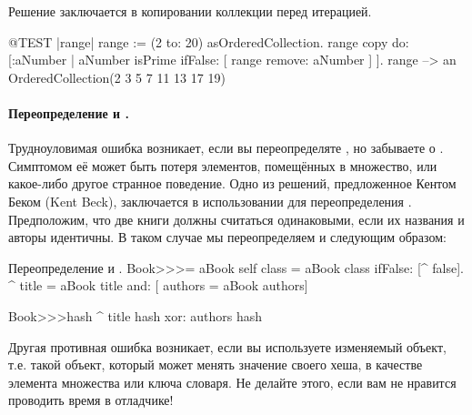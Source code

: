 \documentclass[a4paper,10pt,twoside]{book}
\begin{document}
Решение заключается в копировании коллекции перед итерацией.

\begin{code}{@TEST |range|}
range := (2 to: 20) asOrderedCollection.
range copy do: [:aNumber | aNumber isPrime ifFalse: [ range remove: aNumber ] ].
range --> an OrderedCollection(2 3 5 7 11 13 17 19)
\end{code}

\paragraph{Переопределение \ct{=} и .}
Трудноуловимая ошибка возникает, если вы переопределяте \ct{=}, но забываете о . Симптомом её может быть потеря элементов, помещённых в множество, или какое-либо другое странное поведение. Одно из решений, предложенное Кентом Беком (Kent Beck), заключается в использовании  для переопределения .
Предположим, что две книги должны считаться одинаковыми, если их названия и авторы идентичны.
В таком случае мы переопределяем \ct{=} и  следующим образом:

\begin{method}{Переопределение \lct{=} и .}
Book>>>= aBook
   self class = aBook class ifFalse: [^ false].
   ^ title = aBook title and: [ authors = aBook authors]

Book>>>hash 
   ^ title hash xor: authors hash
\end{method}

Другая противная ошибка возникает, если вы используете изменяемый объект, т.е. такой объект, который может менять значение своего хеша, в качестве элемента множества или ключа словаря.
Не делайте этого, если вам не нравится проводить время в отладчике!
\end{document}
